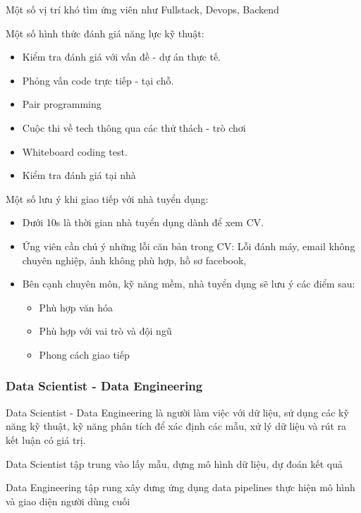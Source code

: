 \documentclass[14pt, a4paper]{article}
\numberwithin{equation}{section}
\numberwithin{figure}{section}
\numberwithin{dl}{section}
\numberwithin{md}{section}
\numberwithin{bd}{section}
\numberwithin{dn}{section}
\numberwithin{hq}{section}
\begin{document}
    Một số vị trí khó tìm ứng viên như Fullstack, Devops, Backend

    Một số hình thức đánh giá năng lực kỹ thuật:

    \begin{itemize}
        \item Kiểm tra đánh giá với vấn đề - dự án thực tế.
        \item Phỏng vấn code trực tiếp - tại chỗ.
        \item Pair programming
        \item Cuộc thi về tech thông qua các thử thách - trò chơi
        \item Whiteboard coding test.
        \item Kiểm tra đánh giá tại nhà
    \end{itemize}

    Một số lưu ý khi giao tiếp với nhà tuyển dụng:

    \begin{itemize}
        \item Dưới 10s là thời gian nhà tuyển dụng dành để xem CV.
        \item Ứng viên cần chú ý những lỗi căn bản trong CV: Lỗi đánh máy, email không chuyên nghiệp, ảnh không phù hợp, hồ sơ facebook,
        \item Bên cạnh chuyên môn, kỹ năng mềm, nhà tuyển dụng sẽ lưu ý các điểm sau:
        \begin{itemize}
            \item Phù hợp văn hóa
            \item Phù hợp với vai trò và đội ngũ
            \item Phong cách giao tiếp
        \end{itemize}
    \end{itemize}

    \subsubsection{Data Scientist - Data Engineering}

    Data Scientist - Data Engineering là người làm việc với dữ liệu, sử dụng các kỹ năng kỹ thuật, kỹ năng phân tích để xác định các mẫu, xử lý dữ liệu và rút ra kết luận có giá trị.

    Data Scientist tập trung vào lấy mẫu, dựng mô hình dữ liệu, dự đoán kết quả

    Data Engineering tập rung xây dưng ứng dụng data pipelines thực hiện mô hình và giao diện người dùng cuối
\end{document}
